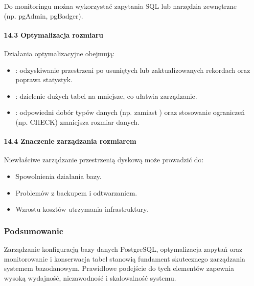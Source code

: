 \documentclass[letterpaper,10pt,polish]{sphinxmanual}
\begin{document}
\sphinxAtStartPar
Do monitoringu można wykorzystać zapytania SQL lub narzędzia zewnętrzne (np. pgAdmin, pgBadger).


\paragraph{14.3 Optymalizacja rozmiaru}
\label{\detokenize{rozdzial2/Konfiguracja_baz_danych/Konfiguracja_baz_danych:optymalizacja-rozmiaru}}
\sphinxAtStartPar
Działania optymalizacyjne obejmują:
\begin{itemize}
\item {} 
\sphinxAtStartPar
{}: odzyskiwanie przestrzeni po usuniętych lub zaktualizowanych rekordach oraz poprawa statystyk.

\item {} 
\sphinxAtStartPar
{}: dzielenie dużych tabel na mniejsze, co ułatwia zarządzanie.

\item {} 
\sphinxAtStartPar
{}: odpowiedni dobór typów danych (np.  zamiast ) oraz stosowanie ograniczeń (np. CHECK) zmniejsza rozmiar danych.

\end{itemize}


\paragraph{14.4 Znaczenie zarządzania rozmiarem}
\label{\detokenize{rozdzial2/Konfiguracja_baz_danych/Konfiguracja_baz_danych:znaczenie-zarzadzania-rozmiarem}}
\sphinxAtStartPar
Niewłaściwe zarządzanie przestrzenią dyskową może prowadzić do:
\begin{itemize}
\item {} 
\sphinxAtStartPar
Spowolnienia działania bazy.

\item {} 
\sphinxAtStartPar
Problemów z backupem i odtwarzaniem.

\item {} 
\sphinxAtStartPar
Wzrostu kosztów utrzymania infrastruktury.

\end{itemize}


\subsubsection{Podsumowanie}
\label{\detokenize{rozdzial2/Konfiguracja_baz_danych/Konfiguracja_baz_danych:podsumowanie}}
\sphinxAtStartPar
Zarządzanie konfiguracją bazy danych PostgreSQL, optymalizacja zapytań oraz monitorowanie i konserwacja tabel stanowią fundament skutecznego zarządzania systemem bazodanowym. Prawidłowe podejście do tych elementów zapewnia wysoką wydajność, niezawodność i skalowalność systemu.
\end{document}
